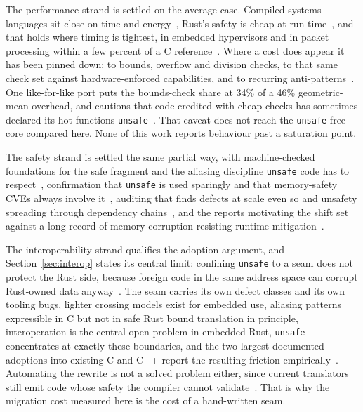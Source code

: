 \documentclass[english,oneside,a4paper,censored,csm,software-track-2020]{HYthesisML}
\begin{document}
\begin{appendices}
The performance strand is settled on the average case. Compiled systems languages sit close on
time and energy~\cite{bugden2022rust,pereira2017energy}, Rust's safety is cheap at run
time~\cite{balasubramanian2017rust,levy2017kernel}, and that holds where timing is tightest, in
embedded hypervisors and in packet processing within a few percent of a C
reference~\cite{mo2023rustshyper,emmerich2019drivers,xiao2024rpkt}.
Where a cost does appear it has been pinned down: to bounds, overflow and division checks, to
that same check set against hardware-enforced capabilities, and to recurring
anti-patterns~\cite{zhang2022runtime,harris2023morello,cui2025perfbugs}. One like-for-like port
puts the bounds-check share at 34\% of a 46\% geometric-mean overhead, and cautions that code
credited with cheap checks has sometimes declared its hot functions
\texttt{unsafe}~\cite{naylor2026cherisimt}. That caveat does not reach the \texttt{unsafe}-free
core compared here. None of this work reports behaviour past a saturation point.

The safety strand is settled the same partial way, with machine-checked foundations for the
safe fragment and the aliasing discipline \texttt{unsafe} code has to
respect~\cite{jung2018rustbelt,jung2021safe,jung2020stacked}, confirmation that \texttt{unsafe} is
used sparingly and that memory-safety CVEs always involve
it~\cite{qin2020rust,astrauskas2020unsafe,xu2021rustcve}, auditing that finds defects at scale even
so and unsafety spreading through dependency
chains~\cite{bae2021rudra,zheng2024security,qin2024safety,evans2020rust}, and the reports
motivating the shift set against a long record of memory corruption resisting runtime
mitigation~\cite{msrc2019memory,google2022android,google2024securebydesign,cisa2023memorysafe,oncd2024building,szekeres2013sok}.

The interoperability strand qualifies the adoption argument, and Section~\ref{sec:interop}
states its central limit: confining \texttt{unsafe} to a seam does not protect the Rust side,
because foreign code in the same address space can corrupt Rust-owned data
anyway~\cite{rivera2021galeed,kirth2022pkrusafe}. The seam carries its own defect classes and its
own tooling bugs, lighter crossing models exist for embedded use, aliasing patterns expressible
in C but not in safe Rust bound translation in principle, interoperation is the central open
problem in embedded Rust, \texttt{unsafe} concentrates at exactly these boundaries, and the two
largest documented adoptions into existing C and C++ report the resulting friction
empirically~\cite{li2022crosslang,cai2026interop,schuermann2023encapsulated,emre2023aliasing,sharma2024embedded,mccormack2026unsafe,li2026rustlinux,fan2026android}.
Automating the rewrite is not a solved problem either, since current translators still emit code
whose safety the compiler cannot validate~\cite{hong2025ctorust}. That is why the migration cost
measured here is the cost of a hand-written seam.


\end{appendices}
\end{document}
